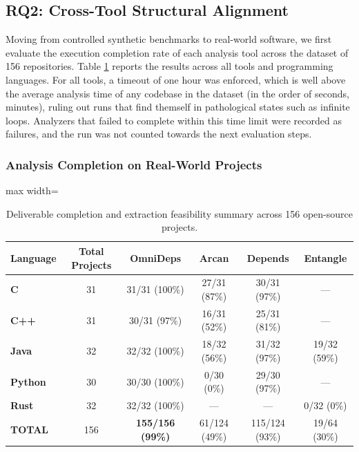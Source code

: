 \subsection{RQ2: Cross-Tool Structural Alignment}
\label{subsec:results_rq2}
\label{subsec:rq2_cross_tool}

Moving from controlled synthetic benchmarks to real-world software, we
first evaluate the execution completion rate of each analysis
tool across the dataset of 156 repositories. Table
\ref{tab:archive_completion_summary} reports the results across all tools
and programming languages. For all tools, a timeout of one hour was
enforced, which is well above the average analysis time of any codebase
in the dataset (in the order of seconds, minutes), ruling out runs
that find themself in pathological states such as infinite loops.
Analyzers that failed to complete within this time
limit were recorded as failures, and the run was not counted towards
the next evaluation steps.

\subsubsection{Analysis Completion on Real-World Projects}
\label{subsec:results_completion}

\begin{table}[htpb]
  \centering
  \small
  \begin{adjustbox}{max width=\textwidth}
    \begin{tabular}{|l|c|c|c|c|c|}
      \hline
      \textbf{Language} & \textbf{Total Projects} & \textbf{OmniDeps}
      & \textbf{Arcan} & \textbf{Depends} & \textbf{Entangle} \\ \hline
      \textbf{C}        & 31  & 31/31 (100\%)  & 27/31 (87\%)  &
      30/31 (97\%)   & ---          \\ \hline
      \textbf{C++}      & 31  & 30/31 (97\%)   & 16/31 (52\%)  &
      25/31 (81\%)   & ---          \\ \hline
      \textbf{Java}     & 32  & 32/32 (100\%)  & 18/32 (56\%)  &
      31/32 (97\%)   & 19/32 (59\%) \\ \hline
      \textbf{Python}   & 30  & 30/30 (100\%)  & 0/30 (0\%)    &
      29/30 (97\%)   & ---          \\ \hline
      \textbf{Rust}     & 32  & 32/32 (100\%)  & ---           & ---
      & 0/32 (0\%)   \\ \hline
      \textbf{TOTAL}    & 156 & \textbf{155/156 (99\%)} & 61/124
      (49\%) & 115/124 (93\%) & 19/64 (30\%) \\ \hline
    \end{tabular}
  \end{adjustbox}
  \caption{Deliverable completion and extraction feasibility summary
  across 156 open-source projects.}
  \label{tab:archive_completion_summary}
\end{table}

